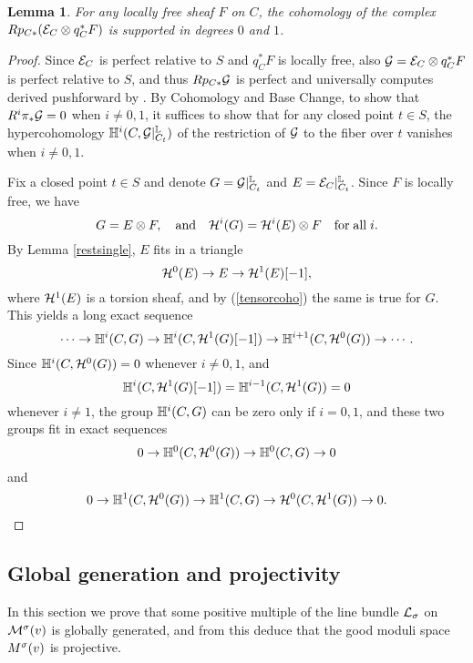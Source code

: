 \documentclass[letterpaper,11pt]{amsart}%
\newtheorem{lem}[thm]{Lemma}
\theoremstyle{remark}
\begin{document}
\begin{lem}\label{restfamily}
For any locally free sheaf $F$ on $C$, the cohomology of the complex $R p_{C*} (\mathcal{E}_C \otimes q_C^*F)$ is supported in degrees $0$ and $1$.
\end{lem}
\begin{proof}
Since $\mathcal{E}_C$ is perfect relative to $S$ and $q_C^*F$ is locally free, also $\mathcal{G} = \mathcal{E}_C \otimes q_C^*F$ is perfect relative to $S$, and thus $R p_{C*} \mathcal{G}$ is perfect and universally computes derived pushforward by \cite[\href{https://stacks.math.columbia.edu/tag/0B91}{Tag 0B91}]{stacks-project}. By Cohomology and Base Change, to show that $R^i \pi_* \mathcal{G} = 0$ when $i \neq 0, 1$, it suffices to show that for any closed point $t \in S$, the hypercohomology $\mathbb{H}^i(C, \mathcal{G}|_{C_t}^{\mathbb{L}})$ of the restriction of $\mathcal{G}$ to the fiber over $t$ vanishes when $i \neq 0,1$.

Fix a closed point $t \in S$ and denote $G = \mathcal{G}|_{C_t}^{\mathbb{L}}$ and $E = \mathcal{E}_C|_{C_t}^{\mathbb{L}}$. Since $F$ is locally free, we have
\begin{equation}\label{tensorcoho}
    G = E \otimes F, \quad \mathrm{and} \quad \mathcal{H}^i(G) = \mathcal{H}^i(E) \otimes F \quad \mathrm{for\;all\;} i.
\end{equation}
By Lemma \ref{restsingle}, $E$ fits in a triangle
\[ \mathcal{H}^0(E) \to E \to \mathcal{H}^1(E)[-1], \]
where $\mathcal{H}^1(E)$ is a torsion sheaf, and by (\ref{tensorcoho}) the same is true for $G$. This yields a long exact sequence
\[ \cdots \to \mathbb{H}^i(C, G) \to \mathbb{H}^i(C, \mathcal{H}^1(G)[-1]) \to \mathbb{H}^{i+1}(C, \mathcal{H}^0(G)) \to \cdots. \] %
Since $\mathbb{H}^i(C, \mathcal{H}^0(G)) = 0$ whenever $i \neq 0, 1$, and 
\[ \mathbb{H}^i(C, \mathcal{H}^1(G)[-1]) = \mathbb{H}^{i-1}(C, \mathcal{H}^1(G)) = 0 \] 
whenever $i \neq 1$, the group $\mathbb{H}^i(C, G)$ can be zero only if $i = 0,1$, and these two groups fit in exact sequences
\[ 0 \to \mathbb{H}^0(C, \mathcal{H}^0(G)) \to \mathbb{H}^0(C, G) \to 0 \] 
and
\[ 0 \to \mathbb{H}^1(C, \mathcal{H}^0(G)) \to \mathbb{H}^1(C, G) \to \mathcal{H}^0(C,\mathcal{H}^1(G)) \to 0. \]
\end{proof}


\subsection{Global generation and projectivity}
In this section we prove that some positive multiple of the line bundle $\mathcal{L}_\sigma$ on $\mathcal{M}^\sigma(v)$ is globally generated, and from this deduce that the good moduli space $M^\sigma(v)$ is projective.
\end{document}
